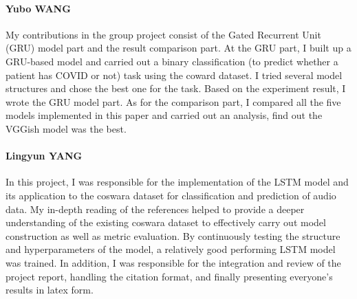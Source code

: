 \documentclass[11pt]{article}
\begin{document}
\paragraph{Yubo WANG}

My contributions in the group project consist of the Gated Recurrent Unit (GRU) model part 
and the result comparison part. At the GRU part, I built up a GRU-based model and carried out 
a binary classification (to predict whether a patient has COVID or not) task using the coward dataset. 
I tried several model structures and chose the best one for the task. 
Based on the experiment result, I wrote the GRU model part. As for the comparison part, 
I compared all the five models implemented in this paper and carried out an analysis, 
find out the VGGish model was the best.

\paragraph{Lingyun YANG}

In this project, I was responsible for the implementation of the LSTM model and its application to the coswara dataset for classification and prediction of audio data. My in-depth reading of the references helped to provide a deeper understanding of the existing coswara dataset to effectively carry out model construction as well as metric evaluation. By continuously testing the structure and hyperparameters of the model, a relatively good performing LSTM model was trained. In addition, I was responsible for the integration and review of the project report, handling the citation format, and finally presenting everyone's results in latex form.

\newpage

\end{document}
